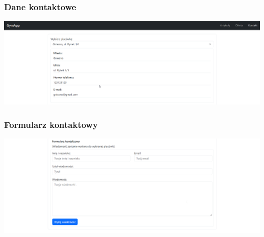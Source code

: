 \documentclass[12pt]{article}
\begin{document}
\subsubsection{Dane kontaktowe}
\includegraphics[width=1\textwidth, angle=0]{images/Interface_localization.png}
\subsubsection{Formularz kontaktowy}
\includegraphics[width=1\textwidth, angle=0]{images/Interface_contact_form.png}
\end{document}
